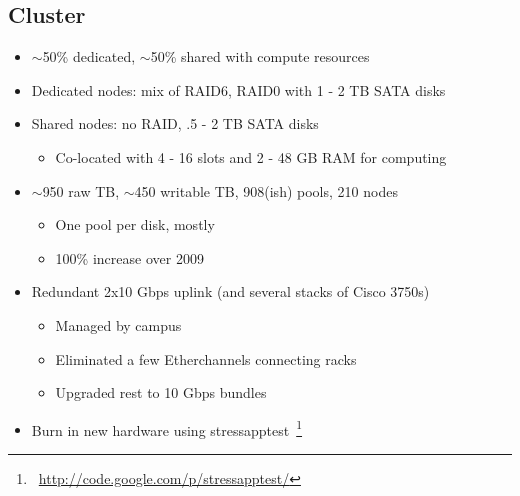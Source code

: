 \documentclass{beamer}
\newcommand{\ca}{\ensuremath{\sim}}
\begin{document}
\subsection{Cluster}
\begin{frame}
\begin{itemize}
	\item \ca{}50\% dedicated, \ca{}50\% shared with compute resources
	\item Dedicated nodes: mix of RAID6, RAID0 with 1 - 2 TB SATA disks
	\item Shared nodes: no RAID, .5 - 2 TB SATA disks
	\begin{itemize}
		\item Co-located with 4 - 16 slots and 2 - 48 GB RAM for computing
	\end{itemize}
	\item \ca{}950 raw TB, \ca{}450 writable TB, 908(ish) pools, 210 nodes
	\begin{itemize}
		\item One pool per disk, mostly
		\item 100\% increase over 2009
	\end{itemize}
	\item Redundant 2x10 Gbps uplink (and several stacks of Cisco 3750s)
	\begin{itemize}
		\item Managed by campus
		\item Eliminated a few Etherchannels connecting racks
		\item Upgraded rest to 10 Gbps bundles
	\end{itemize}
	\item Burn in new hardware using stressapptest~\footnote{~\url{http://code.google.com/p/stressapptest/}}
\end{itemize}
\end{frame}
\end{document}
